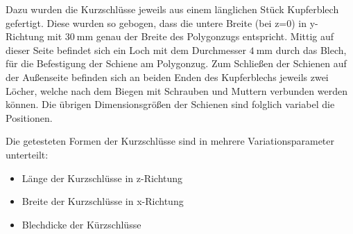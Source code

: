 Dazu wurden die Kurzschl\"usse jeweils aus einem l\"anglichen St\"uck Kupferblech gefertigt. Diese wurden so gebogen, dass die untere Breite (bei z=0) in y-Richtung mit $\SI{30}{\milli\meter}$ genau der Breite des Polygonzugs entspricht. Mittig auf dieser Seite befindet sich ein Loch mit dem Durchmesser $\SI{4}{\milli\meter}$ durch das Blech, für die Befestigung der Schiene am Polygonzug. Zum Schlie\ss{}en der Schienen auf der Au\ss{}enseite befinden sich an beiden Enden des Kupferblechs jeweils zwei L\"ocher, welche nach dem Biegen mit Schrauben und Muttern verbunden werden k\"onnen. Die \"ubrigen Dimensionsgr\"o\ss{}en der Schienen sind folglich variabel die Positionen.
\par
Die getesteten Formen der Kurzschl\"usse sind in mehrere Variationsparameter unterteilt:
\begin{itemize}
	\item Länge der Kurzschl\"usse in z-Richtung
	\item Breite der Kurzschl\"usse in x-Richtung
	\item Blechdicke der K\"urzschl\"usse
\end{itemize}


\newpage




